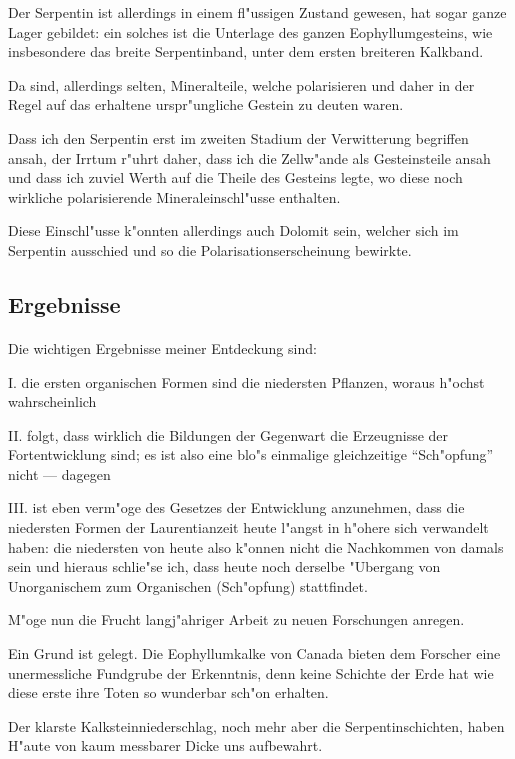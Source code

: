 \documentclass[a4paper, 11pt, oneside, german]{article}
\begin{document}
Der Serpentin ist allerdings in einem fl"ussigen Zustand gewesen, hat sogar ganze Lager gebildet: ein solches ist die Unterlage des ganzen Eophyllumgesteins, wie insbesondere das breite Serpentinband, unter dem ersten breiteren Kalkband.

Da sind, allerdings selten, Mineralteile, welche polarisieren und daher in der Regel auf das erhaltene urspr"ungliche Gestein zu deuten waren.

Dass ich den Serpentin erst im zweiten Stadium der Verwitterung begriffen ansah, der Irrtum r"uhrt daher, dass ich die Zellw"ande als Gesteinsteile ansah und dass ich zuviel Werth auf die Theile des Gesteins legte, wo diese noch wirkliche polarisierende Mineraleinschl"usse enthalten.

Diese Einschl"usse k"onnten allerdings auch Dolomit sein, welcher sich im Serpentin ausschied und so die Polarisationserscheinung bewirkte.
\clearpage
\subsection{Ergebnisse}
\paragraph{}
Die wichtigen Ergebnisse meiner Entdeckung sind:

I. die ersten organischen Formen sind die niedersten Pflanzen, woraus h"ochst wahrscheinlich

II. folgt, dass wirklich die Bildungen der Gegenwart die Erzeugnisse der Fortentwicklung sind; es ist also eine blo"s einmalige gleichzeitige "`Sch"opfung"' nicht --- dagegen

III. ist eben verm"oge des Gesetzes der Entwicklung anzunehmen, dass die niedersten Formen der Laurentianzeit heute l"angst in h"ohere sich verwandelt haben: die niedersten von heute also k"onnen nicht die Nachkommen von damals sein und hieraus schlie"se ich, dass heute noch derselbe "Ubergang von Unorganischem zum Organischen (Sch"opfung) stattfindet.

M"oge nun die Frucht langj"ahriger Arbeit zu neuen Forschungen anregen.

Ein Grund ist gelegt. Die Eophyllumkalke von Canada bieten dem Forscher eine unermessliche Fundgrube der Erkenntnis, denn keine Schichte der Erde hat wie diese erste ihre Toten so wunderbar sch"on erhalten.

Der klarste Kalksteinniederschlag, noch mehr aber die Serpentinschichten, haben H"aute von kaum messbarer Dicke uns aufbewahrt.
\end{document}
